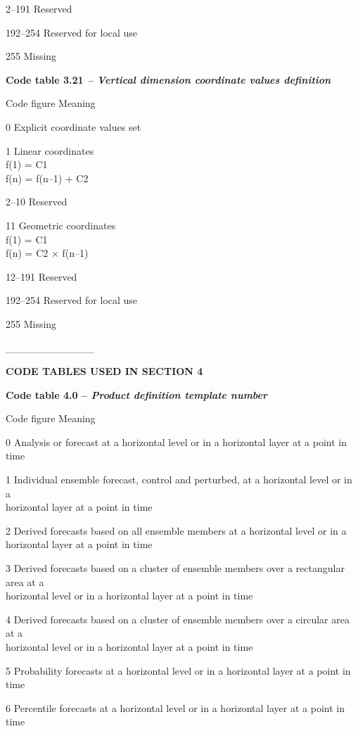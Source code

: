 2--191 Reserved

192--254 Reserved for local use

255 Missing

\textbf{Code table 3.21 \emph{-- Vertical dimension coordinate values definition}}

Code figure Meaning

0 Explicit coordinate values set

1 Linear coordinates\\
f(1) = C1\\
f(n) = f(n--1) + C2

2--10 Reserved

11 Geometric coordinates\\
f(1) = C1\\
f(n) = C2 × f(n--1)

12--191 Reserved

192--254 Reserved for local use

255 Missing

\_\_\_\_\_\_\_\_\_\_\_\_

\textbf{CODE TABLES USED IN SECTION 4}

\textbf{Code table 4.0 -- \emph{Product definition template number}}

Code figure Meaning

0 Analysis or forecast at a horizontal level or in a horizontal layer at a point in time

1 Individual ensemble forecast, control and perturbed, at a horizontal level or in a\\
horizontal layer at a point in time

2 Derived forecasts based on all ensemble members at a horizontal level or in a\\
horizontal layer at a point in time

3 Derived forecasts based on a cluster of ensemble members over a rectangular area at a\\
horizontal level or in a horizontal layer at a point in time

4 Derived forecasts based on a cluster of ensemble members over a circular area at a\\
horizontal level or in a horizontal layer at a point in time

5 Probability forecasts at a horizontal level or in a horizontal layer at a point in time

6 Percentile forecasts at a horizontal level or in a horizontal layer at a point in time

